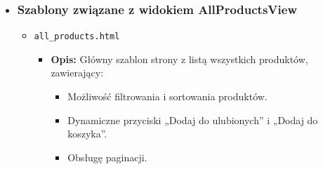 \documentclass[12pt,a4paper,oneside]{article}
\theoremstyle{definition}
\numberwithin{equation}{section}
\begin{document}
\begin{itemize}
    \item \subsubsection*{Szablony związane z widokiem AllProductsView}
        \begin{itemize}
            \item \texttt{all\_products.html}
            \begin{itemize}
                \item \textbf{Opis:} Główny szablon strony z listą wszystkich produktów, zawierający:
                \begin{itemize}
                    \item Możliwość filtrowania i sortowania produktów.
                    \item Dynamiczne przyciski „Dodaj do ulubionych” i „Dodaj do koszyka”.
                    \item Obsługę paginacji.
                \end{itemize}
            \end{itemize}
        \end{itemize}


\end{itemize}
\end{document}
